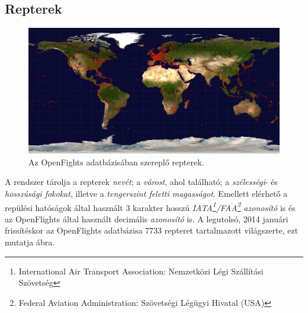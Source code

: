     \subsection{Repterek}
    \begin{figure}[!ht]
      \centering
      \includegraphics[width=150mm,keepaspectratio=true]{./figures/airports-2048.png}

      \caption{Az OpenFights adatbázisában szereplő repterek.}
      \label{fig:figure_repterek}
    \end{figure}

    A rendszer tárolja a repterek \emph{nevét}; a \emph{várost}, ahol található; a \emph{szélességi}- és \emph{hosszúsági fokokat}, illetve a \emph{tengerszint feletti magasságot}. Emellett elérhető a repülési hatóságok által használt 3 karakter hosszú \emph{IATA\footnote{International Air Transport Association: Nemzetközi Légi Szállítási Szövetség}/FAA\footnote{Federal Aviation Administration: Szövetségi Légügyi Hivatal (USA)} azonosító} is és az OpenFlights által használt decimális \emph{azonosító} is. A legutolsó, 2014 januári frissítéskor az OpenFlights adatbázisa 7733 repteret tartalmazott világszerte, ezt mutatja  ábra.

